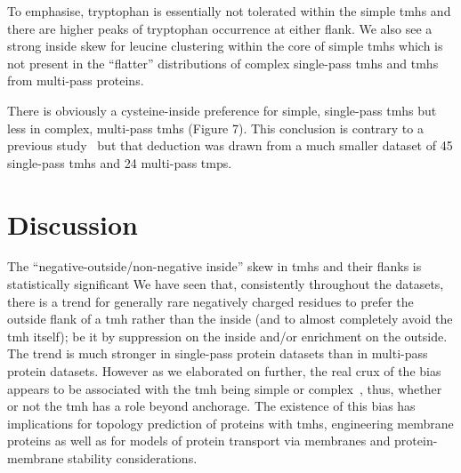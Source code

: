 To emphasise, tryptophan is essentially not tolerated within the simple \gls{tmh}s and there are higher peaks of tryptophan occurrence at either flank. We also see a strong inside skew for leucine clustering within the core of simple \gls{tmh}s which is not present in the “flatter” distributions of complex single-pass \gls{tmh}s and \gls{tmh}s from multi-pass proteins.

There is obviously a cysteine-inside preference for simple, single-pass \gls{tmh}s but less in complex, multi-pass \gls{tmh}s (Figure 7). This conclusion is contrary to a previous study~\cite{Nakashima1992} but that deduction was drawn from a much smaller dataset of 45 single-pass \gls{tmh}s and 24 multi-pass \gls{tmp}s.

\section{Discussion}

The ``negative-outside/non-negative inside'' skew in \gls{tmh}s and their flanks is statistically significant
We have seen that, consistently throughout the datasets, there is a trend for generally rare negatively charged residues to prefer the outside flank of a \gls{tmh} rather than the inside (and to almost completely avoid the \gls{tmh} itself); be it by suppression on the inside and/or enrichment on the outside. The trend is much stronger in single-pass protein datasets than in multi-pass protein datasets. However as we elaborated on further, the real crux of the bias appears to be associated with the \gls{tmh} being simple or complex~\cite{Wong2011, Wong2012}, thus, whether or not the \gls{tmh} has a role beyond anchorage. The existence of this bias has implications for topology prediction of proteins with \gls{tmh}s, engineering membrane proteins as well as for models of protein transport via membranes and protein-membrane stability considerations.

